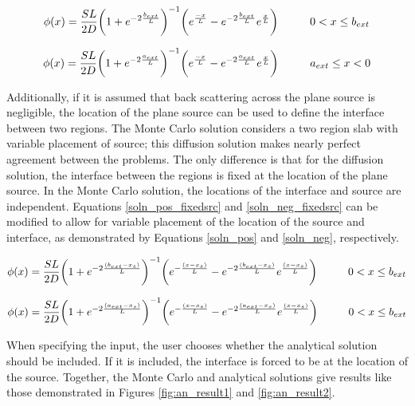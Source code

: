 \documentclass[11pt, oneside]{article}   	%
\newcommand\tab[1][1cm]{\hspace*{#1}}				%
\begin{document}
\begin{equation}
\label{soln_pos_fixedsrc}
\phi(x) = \frac{SL}{2D}\bigg(1+e^{-2\frac{b_{ext}}{L}} \bigg)	^{-1} 	\bigg(e^{\frac{-x}{L}}-e^{-2\frac{b_{ext}}{L}}e^{\frac{x}{L}} \bigg) \tab 0 < x \leq b_{ext}
\end{equation}


\begin{equation}
\label{soln_neg_fixedsrc}
\phi(x) = \frac{SL}{2D}\bigg(1+e^{-2\frac{a_{ext}}{L}} \bigg)	^{-1} 	\bigg(e^{\frac{-x}{L}}-e^{-2\frac{a_{ext}}{L}}e^{\frac{x}{L}} \bigg) \tab a_{ext} \leq x < 0
\end{equation}

Additionally, if it is assumed that back scattering across the plane source is negligible, the location of the plane source can be used to define the interface between two regions. The Monte Carlo solution considers a two region slab with variable placement of source; this diffusion solution makes nearly perfect agreement between the problems. The only difference is that for the diffusion solution, the interface between the regions is fixed at the location of the plane source. In the Monte Carlo solution, the locations of the interface and source are independent. Equations \ref{soln_pos_fixedsrc} and \ref{soln_neg_fixedsrc} can be modified to allow for variable placement of the location of the source and interface, as demonstrated by Equations \ref{soln_pos} and \ref{soln_neg}, respectively.

\begin{equation}
\label{soln_pos}
\phi(x) = \frac{SL}{2D}\bigg(1+e^{-2\frac{(b_{ext}-x_{s})}{L}} \bigg)^{-1} \bigg(e^{-\frac{(x-x_{s})}{L}}-e^{-2\frac{(b_{ext}-x_{s})}{L}}e^{\frac{(x-x_{s})}{L}} \bigg) \tab 0 < x \leq b_{ext}
\end{equation}


\begin{equation}
\label{soln_neg}
\phi(x) = \frac{SL}{2D}\bigg(1+e^{-2\frac{(a_{ext}-x_{s})}{L}} \bigg)^{-1} \bigg(e^{-\frac{(x-x_{s})}{L}}-e^{-2\frac{(a_{ext}-x_{s})}{L}}e^{\frac{(x-x_{s})}{L}} \bigg) \tab 0 < x \leq b_{ext}
\end{equation}

When specifying the input, the user chooses whether the analytical solution should be included. If it is included, the interface is forced to be at the location of the source. Together, the Monte Carlo and analytical solutions give results like those demonstrated in Figures \ref{fig:an_result1} and \ref{fig:an_result2}.
\end{document}
